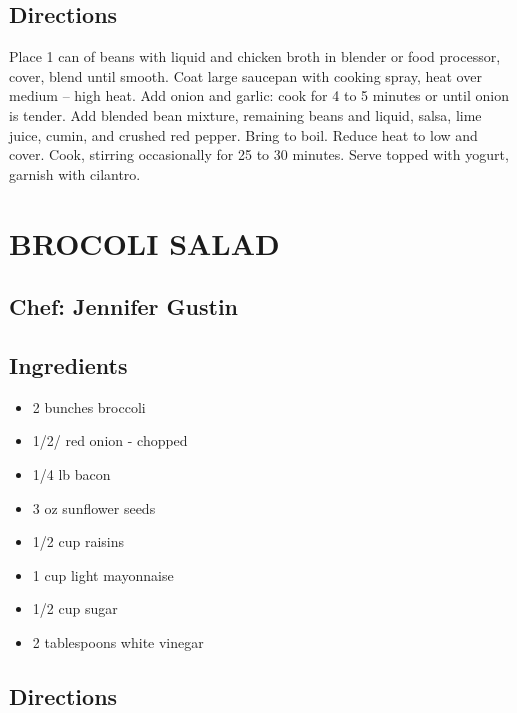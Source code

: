 \documentclass[
]{book}
\providecommand{\tightlist}{%
  \setlength{\itemsep}{0pt}\setlength{\parskip}{0pt}}
\begin{document}
\hypertarget{directions-13}{%
\subsection*{Directions}\label{directions-13}}


Place 1 can of beans with liquid and chicken broth in blender or food processor, cover, blend until smooth.
Coat large saucepan with cooking spray, heat over medium -- high heat. Add onion and garlic: cook for 4 to 5 minutes or until onion is tender.
Add blended bean mixture, remaining beans and liquid, salsa, lime juice, cumin, and crushed red pepper.
Bring to boil. Reduce heat to low and cover. Cook, stirring occasionally for 25 to 30 minutes. Serve topped with yogurt, garnish with cilantro.

\hypertarget{brocoli-salad}{%
\section*{BROCOLI SALAD}\label{brocoli-salad}}


\hypertarget{chef-jennifer-gustin-3}{%
\subsection*{Chef: Jennifer Gustin}\label{chef-jennifer-gustin-3}}


\hypertarget{ingredients-14}{%
\subsection*{Ingredients}\label{ingredients-14}}


\begin{itemize}
\tightlist
\item
  2 bunches broccoli
\item
  1/2/ red onion - chopped
\item
  1/4 lb bacon
\item
  3 oz sunflower seeds
\item
  1/2 cup raisins
\item
  1 cup light mayonnaise
\item
  1/2 cup sugar
\item
  2 tablespoons white vinegar
\end{itemize}

\hypertarget{directions-14}{%
\subsection*{Directions}\label{directions-14}}
\end{document}
